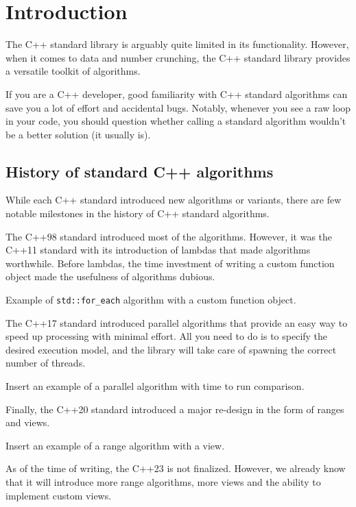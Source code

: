 \chapter{Introduction}

The C++ standard library is arguably quite limited in its functionality. However, when it comes to data and number crunching, the C++ standard library provides a versatile toolkit of algorithms.

If you are a C++ developer, good familiarity with C++ standard algorithms can save you a lot of effort and accidental bugs. Notably, whenever you see a raw loop in your code, you should question whether calling a standard algorithm wouldn't be a better solution (it usually is).

\section{History of standard C++ algorithms}

While each C++ standard introduced new algorithms or variants, there are few notable milestones in the history of C++ standard algorithms.

The C++98 standard introduced most of the algorithms. However, it was the C++11 standard with its introduction of lambdas that made algorithms worthwhile. Before lambdas, the time investment of writing a custom function object made the usefulness of algorithms dubious.

\begin{box-note}
\footnotesize Example of \texttt{std::for_each} algorithm with a custom function object.
\end{box-note}


The C++17 standard introduced parallel algorithms that provide an easy way to speed up processing with minimal effort. All you need to do is to specify the desired execution model, and the library will take care of 
spawning the correct number of threads.

 Insert an example of a parallel algorithm with time to run comparison.

Finally, the C++20 standard introduced a major re-design in the form of ranges and views.

Insert an example of a range algorithm with a view.

As of the time of writing, the C++23 is not finalized. However, we already know that it will introduce more range algorithms, more views and the ability to implement custom views.


